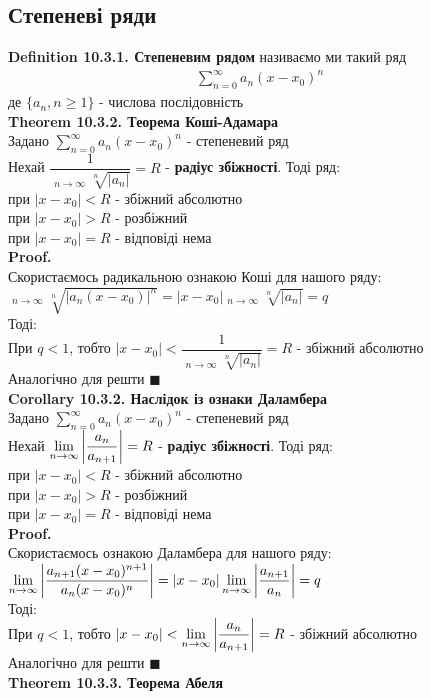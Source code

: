 \documentclass[a4paper, 14pt]{extarticle}
\DeclareMathOperator*\uplim{\overline{lim}}
\def\huge{\displaystyle}
\def\bigline{\vspace{5mm}\\}
\def\defin#1{\textbf{Definition {#1}}}
\def\th#1{\textbf{Theorem {#1}}}
\def\crl#1{\textbf{Corollary {#1}}}
\def\proof{\textbf{Proof.}\\}
\def\bigline{\vspace{5mm}\\}
\def\qed{$\blacksquare$}
\begin{document}
\subsection{Степеневі ряди}
\defin{10.3.1. Степеневим рядом} називаємо ми такий ряд
\begin{align*}
\sum_{n=0}^\infty a_n(x-x_0)^n
\end{align*}
де $\{a_n, n \geq 1\}$ - числова послідовність
\bigline
\th{10.3.2. Теорема Коші-Адамара}\\
Задано $\huge \sum_{n=0}^\infty a_n(x-x_0)^n$ - степеневий ряд\\
Нехай $\dfrac{1}{\huge \uplim_{n \to \infty} \sqrt[n]{|a_n|}} = R$ - \textbf{радіус збіжності}. Тоді ряд:\\
при $|x-x_0|<R$ - збіжний абсолютно\\
при $|x-x_0|>R$ - розбіжний\\
при $|x-x_0|=R$ - відповіді нема\\
\proof
Скористаємось радикальною ознакою Коші для нашого ряду:\\
$\huge \uplim_{n \to \infty} \sqrt[n]{|a_n(x-x_0)|^n} = |x-x_0| \uplim_{n \to \infty} \sqrt[n]{|a_n|} = q$\\
Тоді:\\
При $q < 1$, тобто $|x-x_0| < \dfrac{1}{\huge \uplim_{n \to \infty} \sqrt[n]{|a_n|}} = R$ - збіжний абсолютно\\
Аналогічно для решти \qed
\bigline
\crl{10.3.2. Наслідок із ознаки Даламбера}\\
Задано $\huge \sum_{n=0}^\infty a_n(x-x_0)^n$ - степеневий ряд\\
Нехай $\huge \lim_{n \to \infty} \abs{\dfrac{a_n}{a_{n+1}}} = R$ - \textbf{радіус збіжності}. Тоді ряд:\\
при $|x-x_0|<R$ - збіжний абсолютно\\
при $|x-x_0|>R$ - розбіжний\\
при $|x-x_0|=R$ - відповіді нема\\
\proof
Скористаємось ознакою Даламбера для нашого ряду:\\
$\huge \lim_{n \to \infty} \abs{\dfrac{a_{n+1}(x-x_0)^{n+1}}{a_n(x-x_0)^n}} = |x-x_0| \lim_{n \to \infty} \abs{\dfrac{a_{n+1}}{a_n}} = q$\\
Тоді:\\
При $q < 1$, тобто $|x-x_0| < \huge \lim_{n \to \infty} \abs{\dfrac{a_n}{a_{n+1}}} = R$ - збіжний абсолютно\\
Аналогічно для решти \qed
\bigline
\th{10.3.3. Теорема Абеля}\\
\end{document}
